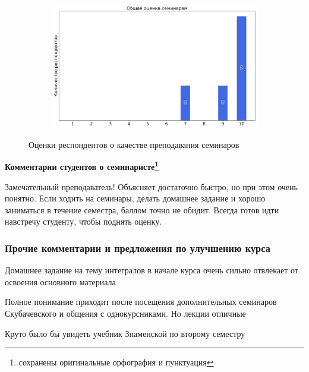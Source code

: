 \begin{figure}[H]
\begin{subfigure}[b]{0.45\textwidth}
			\end{subfigure}
			\begin{subfigure}[b]{0.45\textwidth}
				\centering
				\includegraphics[width=\textwidth]{images/1 course/Математический анализ/seminarists-marks-Шамин А.Ю.-3.png}
			\end{subfigure}	
			\caption{Оценки респондентов о качестве преподавания семинаров}
		\end{figure}

		\textbf{Комментарии студентов о семинаристе\protect\footnote{сохранены оригинальные орфография и пунктуация}}
			\begin{commentbox} 
				Замечательный преподаватель! Объясняет достаточно быстро, но при этом очень понятно. Если ходить на семинары, делать домашнее задание и хорошо заниматься в течение семестра, баллом точно не обидит. Всегда готов идти навстречу студенту, чтобы поднять оценку. 
			\end{commentbox}

	\subsubsection{Прочие комментарии и предложения по улучшению курса}
		\begin{commentbox}
			Домашнее задание на тему интегралов в начале курса очень сильно отвлекает от освоения основного материала
		\end{commentbox}
		
		\begin{commentbox}
			Полное понимание приходит после посещения дополнительных семинаров Скубачевского и общения с однокурсниками. Но лекции отличные
		\end{commentbox}

		\begin{commentbox}
			Круто было бы увидеть учебник Знаменской по второму семестру
		\end{commentbox}

